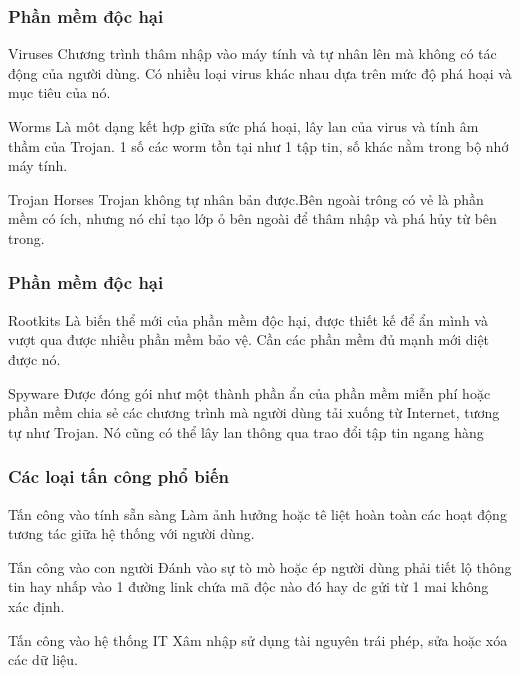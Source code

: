 \documentclass{beamer}
\begin{document}
\begin{frame}
\frametitle{Phần mềm độc hại}
	\begin{block}{Viruses}
	Chương trình thâm nhập vào máy tính và tự nhân lên mà không có tác động của người dùng. Có nhiều loại virus khác nhau dựa trên mức độ phá hoại và mục tiêu của nó. 
	\end{block}
	\begin{block}{Worms}
    Là môt dạng kết hợp giữa sức phá hoại, lây lan của virus và tính âm thầm của Trojan. 1 số các worm tồn tại như 1 tập tin, số khác nằm trong bộ nhớ máy tính.
	\end{block}
	\begin{block}{Trojan Horses}
	Trojan không tự nhân bản được.Bên ngoài trông có vẻ là phần mềm có ích, nhưng nó chỉ tạo lớp ỏ bên ngoài để thâm nhập và phá hủy từ bên trong. 
	\end{block}
\end{frame}

\begin{frame}
\frametitle{Phần mềm độc hại}
	\begin{block}{Rootkits}
   Là biến thể mới của phần mềm độc hại, được thiết kế để ẩn mình và vượt qua được nhiều phần mềm bảo vệ. Cần các phần mềm đủ mạnh mới diệt được nó.
	\end{block}
	\begin{block}{Spyware}
    Được đóng gói như một thành phần ẩn của phần mềm miễn phí hoặc phần mềm chia sẻ các chương trình mà người dùng tải xuống từ Internet, tương tự như Trojan. Nó cũng có thể lây lan thông qua trao đổi tập tin ngang hàng
	\end{block}
\end{frame}
\begin{frame}
\frametitle{Các loại tấn công phổ biến}
	\begin{block}{Tấn công vào tính sẵn sàng}
    Làm ảnh hưởng hoặc tê liệt hoàn  toàn các hoạt động tương tác giữa hệ thống với người dùng. 
	\end{block}
	\begin{block}{Tấn công vào con người}
   Đánh vào sự tò mò hoặc ép người dùng phải tiết lộ thông tin hay nhấp vào 1 đường link chứa mã độc nào đó hay dc gửi từ 1 mai không xác định.
	\end{block}
	\begin{block}{Tấn công vào hệ thống IT}
	Xâm nhập sử dụng tài nguyên trái phép, sửa hoặc xóa các dữ liệu. 
	\end{block}
\end{frame}
\end{document}
